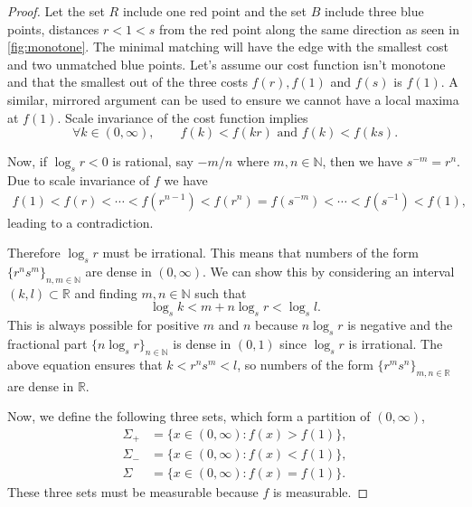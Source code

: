\documentclass{article}
\newcommand{\N}{\mathbb{N}}
\begin{document}
\begin{proof}[Proof]
  Let the set $R$ include one red point and the set $B$ include three
  blue points, distances $r<1<s$ from the red point along the same
  direction as seen in \cref{fig:monotone}.
  The minimal matching will have
  the edge with the smallest cost and two unmatched blue points. Let's
  assume our cost function isn't monotone and that the smallest out of
  the three costs
  $f(r), f(1)$ and $f(s)$ is $f(1)$. A similar, mirrored argument can
  be used to ensure we cannot have a local maxima at $f(1)$. Scale invariance of the cost
  function implies  \begin{equation*}
  \forall k\in(0,\infty),\qquad   f(k)<f(kr) \mbox{ and } f(k)<f(ks).
\end{equation*}

  Now, if $\log_s r<0$ is rational, say $-m/n$ where $m,n\in\N$, then we have
  $s^{-m} = r^n$. Due to scale invariance of $f$ we  have
  \begin{align*}
    f(1)<f(r)<\cdots<f(r^{n-1})<f(r^n)=f(s^{-m})
    <\cdots<f(s^{-1})<f(1),
  \end{align*}
  leading to a contradiction.



  Therefore $\log_s r$ must be irrational. This means that numbers of the
  form $\{r^n s^m\}_{n,m\in\mathbb{N}}$ are dense in $(0,\infty)$. We
  can show this by considering an interval $(k,l)\subset\mathbb{R}$
  and finding $m,n\in\mathbb{N}$ such that $$ \log_s k < m + n \log_s
  r < \log_s l. $$ This is always possible for positive $m$ and $n$
  because $n\log_s r$ is negative and the fractional part $\{n\log_s
  r\}_{n\in\mathbb{N}}$ is dense in $(0,1)$ since $\log_s  r$ is
  irrational. The above equation ensures that $k<r^n s^m<l$, so
  numbers of the form $\{r^m s^n\}_{m,n\in\mathbb{R}}$ are dense in
  $\mathbb{R}$.

  Now, we define the following three sets, which form a partition of
  $(0,\infty)$,
  \begin{align*}
    \Sigma_+ &= \{x\in(0,\infty):f(x)>f(1)\},\\
    \Sigma_-& = \{x\in(0,\infty):f(x)<f(1)\}, \\
    \Sigma &= \{x\in(0,\infty):f(x)=f(1)\}.
  \end{align*}
  These three sets must be measurable
  because $f$ is measurable.


\end{proof}
\end{document}
